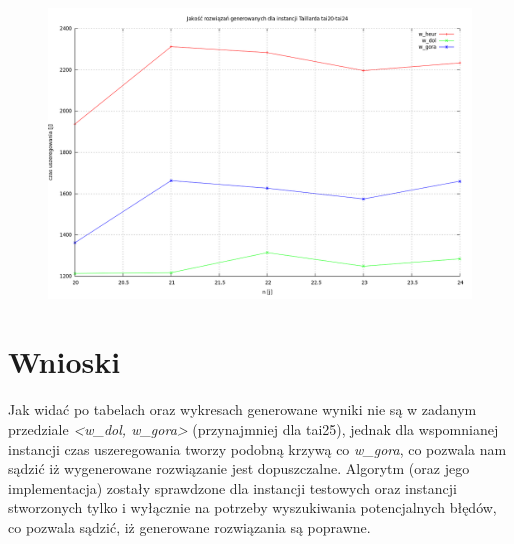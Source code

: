 \documentclass[a4paper,11pt]{article}
\begin{document}
\begin{figure}[!h]
\begin{center}
\includegraphics[scale=0.39]{images/wyk3.png} \\
\end {center}
\end{figure}

\pagebreak
\section{Wnioski}
Jak widać po tabelach oraz wykresach generowane wyniki nie są w zadanym przedziale \emph{<w\_dol, w\_gora>} (przynajmniej dla tai25), jednak dla wspomnianej instancji czas uszeregowania tworzy podobną krzywą co \emph{w\_gora}, co pozwala nam sądzić iż wygenerowane rozwiązanie jest dopuszczalne. Algorytm (oraz jego implementacja) zostały sprawdzone dla instancji testowych oraz instancji stworzonych tylko i wyłącznie na potrzeby wyszukiwania potencjalnych błędów, co pozwala sądzić, iż generowane rozwiązania są poprawne.
\end{document}
